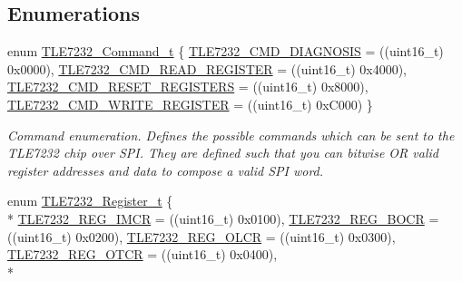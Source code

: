 \subsection*{Enumerations}
\begin{DoxyCompactItemize}
\item 
enum \hyperlink{group__tle7232__driver_gadfd620e995ab38cff032a38f7a26c750}{T\-L\-E7232\-\_\-\-Command\-\_\-t} \{ \hyperlink{group__tle7232__driver_ggadfd620e995ab38cff032a38f7a26c750a0c2fb7bd6f85d6b969d4994b4df86ec2}{T\-L\-E7232\-\_\-\-C\-M\-D\-\_\-\-D\-I\-A\-G\-N\-O\-S\-I\-S} = ((uint16\-\_\-t) 0x0000), 
\hyperlink{group__tle7232__driver_ggadfd620e995ab38cff032a38f7a26c750a6d83b794ae8afa281ba77ad2ce8bb1e2}{T\-L\-E7232\-\_\-\-C\-M\-D\-\_\-\-R\-E\-A\-D\-\_\-\-R\-E\-G\-I\-S\-T\-E\-R} = ((uint16\-\_\-t) 0x4000), 
\hyperlink{group__tle7232__driver_ggadfd620e995ab38cff032a38f7a26c750a92f81a617ea64c1750305ee7f78295ea}{T\-L\-E7232\-\_\-\-C\-M\-D\-\_\-\-R\-E\-S\-E\-T\-\_\-\-R\-E\-G\-I\-S\-T\-E\-R\-S} = ((uint16\-\_\-t) 0x8000), 
\hyperlink{group__tle7232__driver_ggadfd620e995ab38cff032a38f7a26c750a84c6f231bfdf34e25a62748562eebc03}{T\-L\-E7232\-\_\-\-C\-M\-D\-\_\-\-W\-R\-I\-T\-E\-\_\-\-R\-E\-G\-I\-S\-T\-E\-R} = ((uint16\-\_\-t) 0x\-C000)
 \}
\begin{DoxyCompactList}\small\item\em Command enumeration. Defines the possible commands which can be sent to the T\-L\-E7232 chip over S\-P\-I. They are defined such that you can bitwise O\-R valid register addresses and data to compose a valid S\-P\-I word. \end{DoxyCompactList}\item 
enum \hyperlink{group__tle7232__driver_gabd1d28f92015db8d6a418c8346f4b4ff}{T\-L\-E7232\-\_\-\-Register\-\_\-t} \{ \\*
\hyperlink{group__tle7232__driver_ggabd1d28f92015db8d6a418c8346f4b4ffac605987bd4b9ba532b761e612677c4e8}{T\-L\-E7232\-\_\-\-R\-E\-G\-\_\-\-I\-M\-C\-R} = ((uint16\-\_\-t) 0x0100), 
\hyperlink{group__tle7232__driver_ggabd1d28f92015db8d6a418c8346f4b4ffaf59e5d7aecd963852e51afddc0beb495}{T\-L\-E7232\-\_\-\-R\-E\-G\-\_\-\-B\-O\-C\-R} = ((uint16\-\_\-t) 0x0200), 
\hyperlink{group__tle7232__driver_ggabd1d28f92015db8d6a418c8346f4b4ffad2e338648c58e761ac1a67cdb835ddee}{T\-L\-E7232\-\_\-\-R\-E\-G\-\_\-\-O\-L\-C\-R} = ((uint16\-\_\-t) 0x0300), 
\hyperlink{group__tle7232__driver_ggabd1d28f92015db8d6a418c8346f4b4ffacc6c5d10483955ece767f0479156d5c8}{T\-L\-E7232\-\_\-\-R\-E\-G\-\_\-\-O\-T\-C\-R} = ((uint16\-\_\-t) 0x0400), 
\\*

\end{DoxyCompactItemize}
